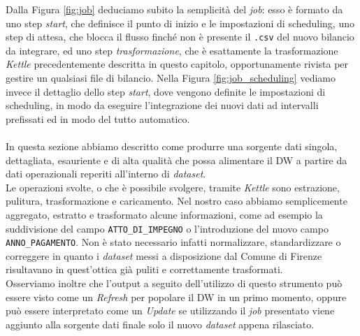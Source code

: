 		Dalla Figura \ref{fig:job} deduciamo subito la semplicità del \textit{job}: esso è formato da uno step \textit{start}, che definisce il punto di inizio e le impostazioni di scheduling, uno step di attesa, che blocca il flusso finché non è presente il \texttt{.csv} del nuovo bilancio da integrare, ed uno step \textit{trasformazione}, che è esattamente la trasformazione \textit{Kettle} precedentemente descritta in questo capitolo, opportunamente rivista per gestire un qualsiasi file di bilancio. Nella Figura \ref{fig:job_scheduling} vediamo invece il dettaglio dello step \textit{start}, dove vengono definite le impostazioni di scheduling, in modo da eseguire l'integrazione dei nuovi dati ad intervalli prefissati ed in modo del tutto automatico.\\
		\\
		In questa sezione abbiamo descritto come produrre una sorgente dati singola, dettagliata, esauriente e di alta qualità che possa alimentare il DW a partire da dati operazionali reperiti all'interno di \textit{dataset}.\\
		Le operazioni svolte, o che è possibile svolgere, tramite \textit{Kettle} sono estrazione, pulitura, trasformazione e caricamento. Nel nostro caso abbiamo semplicemente aggregato, estratto e trasformato alcune informazioni, come ad esempio la suddivisione del campo \texttt{ATTO\_DI\_IMPEGNO} o l'introduzione del nuovo campo \texttt{ANNO\_PAGAMENTO}. Non è stato necessario infatti normalizzare, standardizzare o correggere in quanto i \textit{dataset} messi a disposizione dal Comune di Firenze risultavano in quest'ottica già puliti e correttamente trasformati.\\
		Osserviamo inoltre che l'output a seguito dell'utilizzo di questo strumento può essere visto come un \textit{Refresh} per popolare il DW in un primo momento, oppure può essere interpretato come un \textit{Update} se utilizzando il \textit{job} presentato viene aggiunto alla sorgente dati finale solo il nuovo \textit{dataset} appena rilasciato.
